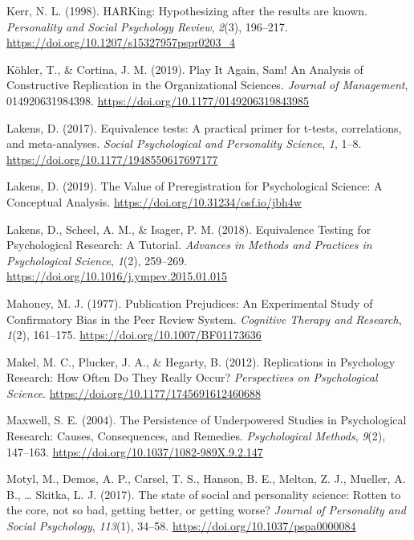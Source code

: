\documentclass[british,,jou,floatsintext]{apa6}
\begin{document}
\leavevmode\hypertarget{ref-Kerr1998}{}%
Kerr, N. L. (1998). HARKing: Hypothesizing after the results are known. \emph{Personality and Social Psychology Review}, \emph{2}(3), 196--217. \url{https://doi.org/10.1207/s15327957pspr0203_4}

\leavevmode\hypertarget{ref-Kohler2019}{}%
Köhler, T., \& Cortina, J. M. (2019). Play It Again, Sam! An Analysis of Constructive Replication in the Organizational Sciences. \emph{Journal of Management}, 014920631984398. \url{https://doi.org/10.1177/0149206319843985}

\leavevmode\hypertarget{ref-R-TOSTER}{}%
Lakens, D. (2017). Equivalence tests: A practical primer for t-tests, correlations, and meta-analyses. \emph{Social Psychological and Personality Science}, \emph{1}, 1--8. \url{https://doi.org/10.1177/1948550617697177}

\leavevmode\hypertarget{ref-Lakens2019b}{}%
Lakens, D. (2019). The Value of Preregistration for Psychological Science: A Conceptual Analysis. \url{https://doi.org/10.31234/osf.io/jbh4w}

\leavevmode\hypertarget{ref-Lakens2018a}{}%
Lakens, D., Scheel, A. M., \& Isager, P. M. (2018). Equivalence Testing for Psychological Research: A Tutorial. \emph{Advances in Methods and Practices in Psychological Science}, \emph{1}(2), 259--269. \url{https://doi.org/10.1016/j.ympev.2015.01.015}

\leavevmode\hypertarget{ref-Mahoney1977}{}%
Mahoney, M. J. (1977). Publication Prejudices: An Experimental Study of Confirmatory Bias in the Peer Review System. \emph{Cognitive Therapy and Research}, \emph{1}(2), 161--175. \url{https://doi.org/10.1007/BF01173636}

\leavevmode\hypertarget{ref-Makel2012}{}%
Makel, M. C., Plucker, J. A., \& Hegarty, B. (2012). Replications in Psychology Research: How Often Do They Really Occur? \emph{Perspectives on Psychological Science}. \url{https://doi.org/10.1177/1745691612460688}

\leavevmode\hypertarget{ref-Maxwell2004}{}%
Maxwell, S. E. (2004). The Persistence of Underpowered Studies in Psychological Research: Causes, Consequences, and Remedies. \emph{Psychological Methods}, \emph{9}(2), 147--163. \url{https://doi.org/10.1037/1082-989X.9.2.147}

\leavevmode\hypertarget{ref-Motyl2017}{}%
Motyl, M., Demos, A. P., Carsel, T. S., Hanson, B. E., Melton, Z. J., Mueller, A. B., \ldots{} Skitka, L. J. (2017). The state of social and personality science: Rotten to the core, not so bad, getting better, or getting worse? \emph{Journal of Personality and Social Psychology}, \emph{113}(1), 34--58. \url{https://doi.org/10.1037/pspa0000084}
\end{document}
